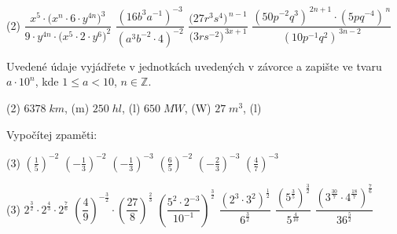 \documentclass[12pt,a4paper]{article}
\begin{document}
\newpage
\begin{exercise}
    \begin{tasks}(2)
        \task $\dfrac{x^{5}\cdot\bigl(x^{n}\cdot 6 \cdot y^{4n}\bigr)^{3}}{9 \cdot y^{4n}\cdot\bigl(x^{5}\cdot 2 \cdot y^{6}\bigr)^{2}}$    
        \task $\dfrac{(16b^{3}a^{-1})^{-3}}{(a^{3}b^{-2}\cdot 4)^{-2}}$
        \task $\dfrac{\bigl(27r^{3}s^{4}\bigr)^{\,n-1}}{\bigl(3rs^{-2}\bigr)^{\,3x+1}}$
        \task $\dfrac{(50p^{-2}q^{3})^{\,2n+1}\cdot(5pq^{-4})^{\,n}}{(10p^{-1}q^{2})^{\,3n-2}}$
    \end{tasks}
\end{exercise}


\setcounter{section}{4}
\begin{exercise}
    Uvedené údaje vyjádřete v jednotkách uvedených v závorce a zapište ve tvaru $a \cdot 10^n$, kde $1 \leq a < 10$, $n \in \mathbb{Z}$.
    \begin{tasks}(2)
        \task $6 378\;km$, (m)
        \task $250\;hl$, (l)
        \task $650\;MW$, (W)
        \task $27 \; m^3$, (l)
    \end{tasks}
\end{exercise}


\setcounter{section}{5}
\begin{exercise}
    Vypočítej zpaměti:
    \begin{tasks}(3)
        \task $\left(\tfrac{1}{5}\right)^{-2}$
        \task $\left(-\tfrac{1}{3}\right)^{-2}$
        \task $\left(-\tfrac{1}{3}\right)^{-3}$
        \task $\left(\tfrac{6}{5}\right)^{-2}$
        \task $\left(-\tfrac{2}{3}\right)^{-3}$
        \task $\left(\tfrac{4}{7}\right)^{-3}$
    \end{tasks}
\end{exercise}


\begin{exercise}
    \begin{tasks}(3)
        \task $2^{\tfrac{3}{2}} \cdot 2^{\tfrac{4}{3}} \cdot 2^{\tfrac{7}{6}}$
        \task $\left(\dfrac{4}{9}\right)^{-\tfrac{3}{2}} \cdot \left(\dfrac{27}{8}\right)^{\tfrac{2}{3}}$
        \task $\left(\dfrac{5^{2}\cdot 2^{-3}}{10^{-1}}\right)^{\tfrac{3}{2}}$
        \task $\dfrac{(2^{3}\cdot 3^{2})^{\tfrac{1}{2}}}{6^{\tfrac{3}{2}}}$
        \task $\dfrac{(5^{\frac{3}{5}})^{\tfrac{3}{2}}}{5^{\frac{4}{10}}}$
        \task $\dfrac{(3^{\frac{30}{7}} \cdot 4^{\frac{18}{7}})^{\frac{7}{6}}}{36^{\frac{5}{2}}}$
    \end{tasks}
\end{exercise}
\end{document}
